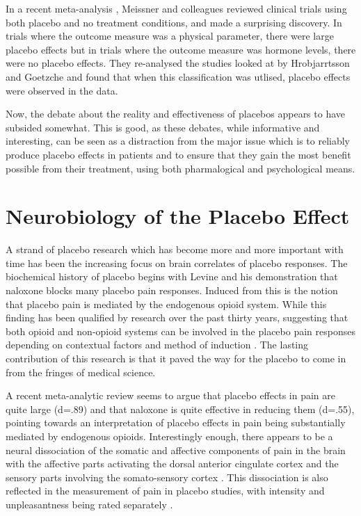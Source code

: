 In a recent meta-analysis  \cite{Meissner2007}, Meissner and colleagues reviewed clinical trials using both placebo and no treatment conditions, and made a surprising discovery. In trials where the outcome measure was a physical parameter, there were large placebo effects but in trials where the outcome measure was hormone levels, there were no placebo effects. They re-analysed the studies looked at by Hrobjarrtsson and Goetzche and found that when this classification was utlised, placebo effects were observed in the data. 

Now, the debate about the reality and effectiveness of placebos appears to have subsided somewhat. This is good, as these debates, while informative and interesting, can be seen as a distraction from the major issue which is to reliably produce placebo effects in patients and to ensure that they gain the most benefit possible from their treatment, using both pharmalogical and psychological means. 
 

\section{Neurobiology of the Placebo Effect}
\label{sec:neur-plac-effect}

A strand of placebo research which has become more and more important with time has been the increasing focus on brain correlates of placebo responses. The biochemical history of placebo begins with Levine \cite{Levine1978a}and his demonstration that naloxone blocks many placebo pain responses. Induced from this is the notion that placebo pain is mediated by the endogenous opioid system. While this finding has been qualified by research over the past thirty years, suggesting that both opioid and non-opioid systems can be involved in the placebo pain responses depending on contextual factors and method of induction \cite{Amanzio2001,Benedetti2003a}. The lasting contribution of this research is that it paved the way for the placebo to come in from the fringes of medical science.

 A recent meta-analytic review \cite{Sauro2005} seems to argue that placebo effects in pain are quite large (d=.89) and that naloxone is quite effective in reducing them (d=.55), pointing towards an interpretation of placebo effects in pain being substantially mediated by endogenous opioids. Interestingly enough, there appears to be a neural dissociation of the somatic and affective components of pain in the brain with the affective parts activating the dorsal anterior cingulate cortex and the sensory parts involving the somato-sensory cortex \cite{Lieberman2004} . This dissociation is also reflected in the measurement of pain in placebo studies, with intensity and unpleasantness being rated separately \cite{Price2008}.

